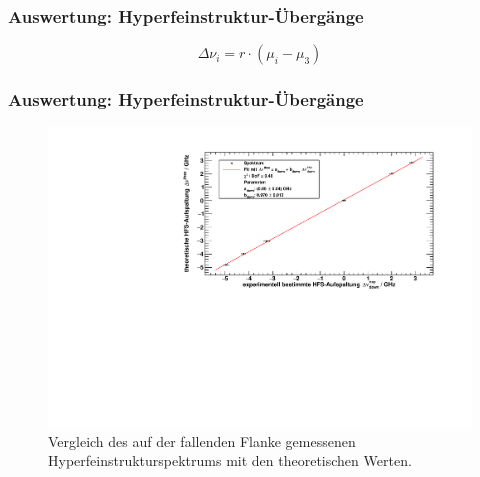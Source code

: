\begin{frame}
\frametitle{Auswertung: Hyperfeinstruktur-Übergänge}
\begin{equation*}
    \Delta \nu_i = r \cdot \left( \mu_i - \mu_3 \right)
\end{equation*}
\end{frame}

\begin{frame}
\frametitle{Auswertung: Hyperfeinstruktur-Übergänge}
\begin{figure}
\begin{center}
    \includegraphics[width=\textwidth]{../img/down-spectrum.pdf}
    \caption{Vergleich des auf der fallenden Flanke gemessenen Hyperfeinstrukturspektrums mit den theoretischen Werten.}
\end{center}
\end{figure}
\end{frame}

